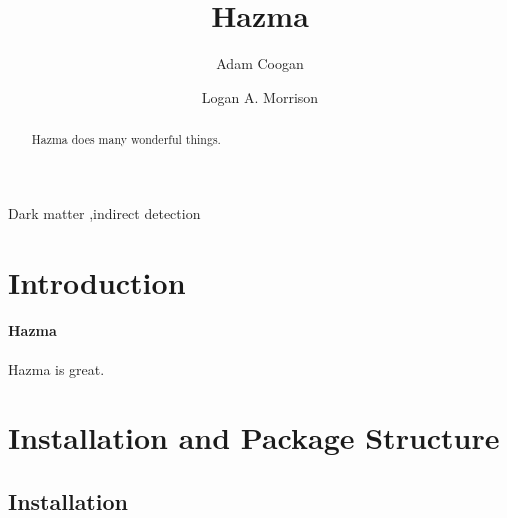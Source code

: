 







\begin{frontmatter}

	\title{Hazma}

	\author[grappa,ucsc,scipp]{Adam Coogan}

	\author[ucsc,scipp]{Logan A. Morrison}

	\address[grappa]{GRAPPA, Institute of Physics, University of Amsterdam, 1098 XH Amsterdam, The Netherlands}
	\address[ucsc]{Department of Physics, 1156 High St., University of California Santa Cruz, Santa Cruz, CA 95064, USA}
	\address[scipp]{Santa Cruz Institute for Particle Physics, 1156 High St., Santa Cruz, CA 95064, USA}

	\begin{abstract}
		Hazma does many wonderful things.
	\end{abstract}

	\begin{keyword}
		Dark matter \sep indirect detection
	\end{keyword}

\end{frontmatter}

\section{Introduction}

\paragraph{Hazma} Hazma is great.

\section{Installation and Package Structure}%
\label{sec:installation}

\subsection{Installation}


